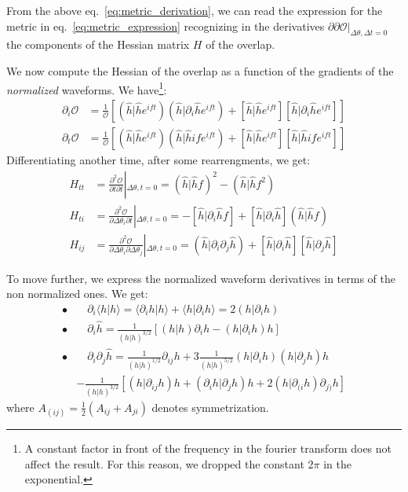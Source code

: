 \documentclass[twocolumn,showpacs,preprintnumbers,nofootinbib,prd,
superscriptaddress,10pt]{revtex4-1}
\newcommand{\scalar}[2]{\langle #1|#2 \rangle}
\newcommand{\rescalar}[2]{( #1|#2 )}
\newcommand{\imscalar}[2]{[ #1|#2 ]}
\begin{document}
From the above eq.~\eqref{eq:metric_derivation}, we can read the expression for the metric in eq.~\eqref{eq:metric_expression} recognizing in the derivatives $\partial\partial\mathcal{O}|_{\Delta\theta, \Delta t = 0}$ the components of the Hessian matrix $H$ of the overlap.

We now compute the Hessian of the overlap as a function of the gradients of the {\it normalized} waveforms.
We have\footnote{
A constant factor in front of the frequency in the fourier transform does not affect the result. For this reason, we dropped the constant $2\pi$ in the exponential.}:
\begin{align}
	\partial_i \mathcal{O} &= \frac{1}{\mathcal{O}} \left[ \rescalar{\hat{h}}{\hat{h}e^{ift}}\rescalar{\hat{h}}{\partial_i\hat{h}e^{ift}} + \imscalar{\hat{h}}{\hat{h}e^{ift}}\imscalar{\hat{h}}{\partial_i\hat{h}e^{ift}} \right]\\
	\partial_t \mathcal{O} &= \frac{1}{\mathcal{O}} \left[ \rescalar{\hat{h}}{\hat{h}e^{ift}}\rescalar{\hat{h}}{\hat{h}if e^{ift}} + \imscalar{\hat{h}}{\hat{h}e^{ift}}\imscalar{\hat{h}}{\hat{h}if e^{ift}} \right]
\end{align}
Differentiating another time, after some rearrengments, we get:
\begin{align}
H_{tt} &= \frac{\partial^2 \mathcal{O}}{\partial t \partial t } \left|_{\Delta\theta, t = 0}
								= \rescalar{\hat{h}}{\hat{h}f}^2 - \rescalar{\hat{h}}{\hat{h}f^2} \label{eq:H_tt}\\
H_{ti} &= \frac{\partial^2 \mathcal{O}}{\partial \Delta \theta_i \partial t } \left|_{\Delta\theta, t = 0}
								= - \imscalar{\hat{h}}{\partial_i \hat{h}f} + \imscalar{\hat{h}}{\partial_i\hat{h}} \rescalar{\hat{h}}{\hat{h}f} \label{eq:H_ti}\\
H_{ij} &= \frac{\partial^2 \mathcal{O}}{\partial \Delta \theta_i \partial \Delta \theta_j }\left|_{\Delta\theta, t = 0}
								= \rescalar{\hat{h}}{\partial_i\partial_j\hat{h}} +\imscalar{\hat{h}}{\partial_i\hat{h}} \imscalar{\hat{h}}{\partial_j\hat{h}} \label{eq:H_ij}
\end{align}

To move further, we express the normalized waveform derivatives in terms of the non normalized ones. We get:
\begin{align*}
	\bullet&\quad \partial_i \scalar{h}{h} = \scalar{\partial_i h}{h}+ \scalar{h}{\partial_i h} = 2 \rescalar{h}{\partial_i h} \\
	\bullet&\quad \partial_i \hat{h} =\frac{1}{\rescalar{h}{h}^{3/2}} \left[ \rescalar{h}{h}\partial_i h -  \rescalar{h}{\partial_i h} h \right]	\\
	\bullet &\quad \partial_i \partial_j \hat{h} = \frac{1}{\rescalar{h}{h}^{1/2}} \partial_{ij}h 	+3 \frac{1}{\rescalar{h}{h}^{5/2}} \rescalar{h}{\partial_i h}\rescalar{h}{\partial_j h}h \\
	&- \frac{1}{\rescalar{h}{h}^{3/2}} \left[\rescalar{h}{ \partial_{ij} h} h + \rescalar{\partial_i h}{\partial_j h}  h
		+2\rescalar{h}{\partial_{(i} h} \partial_{j)} h \right]
\end{align*}
where $A_{(ij)} = \frac{1}{2}(A_{ij}+A_{ji})$ denotes symmetrization.
\end{document}
